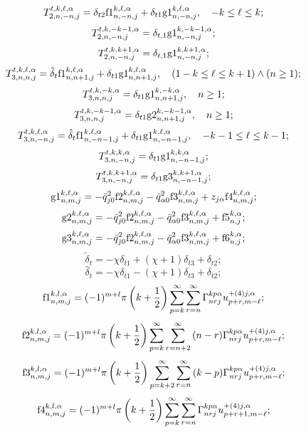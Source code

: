 \begin{theorem}
\[T_{2,n, - n,j}^{t,k,\ell ,\alpha } = {\delta _{t2}}{\rm{f1}}_{n, - n,j}^{k,\ell ,\alpha } + {\delta _{t1}}{\rm g1}_{n, - n,j}^{k,\ell ,\alpha },\quad - k \le \ell  \le k;\]
\[T_{2,n, - n,j}^{t,k,-k-1,\alpha } =  {\delta _{t,1}}{\rm g1}_{n, - n,j}^{k,-k-1,\alpha };\]
\[T_{2,n, - n,j}^{t,k,k + 1,\alpha } =  {\delta _{t,1}}{\rm g1}_{n, - n,j}^{k,k + 1,\alpha };\]
\[T_{3,n,n,j}^{t,k,\ell ,\alpha } = {\tilde \delta _t}{\rm{f1}}_{n,n + 1,j}^{k,\ell ,\alpha } + {\delta _{t1}}{\rm g1}_{n,n + 1,j}^{k,\ell ,\alpha },\quad (1 - k \le \ell  \le k + 1) \wedge (n \ge 1);\]
\[T_{3,n,n,j}^{t,k, - k,\alpha } = {\delta _{t1}}{\rm g1}_{n,n + 1,j}^{k, - k,\alpha },\quad n\ge 1;\]
\[T_{3,n,n,j}^{t,k, - k - 1,\alpha } = {\delta _{t1}}{\rm g2}_{n,n + 1,j}^{k, - k - 1,\alpha },\quad n\ge 1;\]
\[T_{3,n, - n,j}^{t,k,\ell ,\alpha } = {\hat \delta _t}{\rm{f1}}_{n, - n - 1,j}^{k,\ell ,\alpha } + {\delta _{t1}}{\rm g1}_{n, - n - 1,j}^{k,\ell ,\alpha },\quad - k - 1 \le \ell  \le k - 1;\]
\[T_{3,n, - n,j}^{t,k,k,\alpha } = {\delta _{t1}}{\rm g1}_{n, - n - 1,j}^{k,k,\alpha };\]
\[T_{3,n, - n,j}^{t,k,k + 1,\alpha } = {\delta _{t1}}{\rm g3}_{n, - n - 1,j}^{k,k + 1,\alpha };\]
\[{\rm g1}_{n,m,j}^{k,\ell ,\alpha } = -{{\bar q}}_{j0}^2{\rm{f2}}_{n,m,j}^{k,\ell ,\alpha } - {{\bar q}}_{\alpha 0}^2{\rm{f3}}_{n,m,j}^{k,\ell ,\alpha } + {{{z}}_{{{j}}\alpha }}{\rm{f4}}_{n,m,j}^{k,\ell ,\alpha };\]
\[{\rm g2}_{n,m,j}^{k,\ell ,\alpha } = -{{\bar q}}_{j0}^2{\rm{f2}}_{n,m,j}^{k,\ell ,\alpha } - {{\bar q}}_{\alpha 0}^2{\rm{f3}}_{n,m,j}^{k,\ell ,\alpha } + {\rm{f5}}_{n,j}^{k,\alpha };\]
\[{\rm g3}_{n,m,j}^{k,\ell ,\alpha } = -{{\bar q}}_{j0}^2{\rm{f2}}_{n,m,j}^{k,\ell ,\alpha } - {{\bar q}}_{\alpha 0}^2{\rm{f3}}_{n,m,j}^{k,\ell ,\alpha } + {\rm{f6}}_{n,j}^{k,\alpha };\]
\[{\tilde \delta _t} =  - \chi {\delta _{t1}} + (\chi  + 1){\delta _{t3}} + {\delta _{t2}};\]
\[{\hat \delta _t} =  - \chi {\delta _{t1}} - (\chi  + 1){\delta _{t3}} + {\delta _{t2}};\]
\[{\rm{f1}}_{n,m,j}^{k,l,\alpha } = (-1)^{m+l}\pi \left( {k + \frac{1}{2}} \right)\sum\limits_{p = k}^\infty  {\sum\limits_{r = n}^\infty  {\Gamma _{nrj}^{kp\alpha }{u}_{p + r,m - \ell }^{ + (4)j,\alpha }} };\]
\[{\rm{f2}}_{n,m,j}^{k,l,\alpha } = (-1)^{m+l}\pi \left( {k + \frac{1}{2}} \right)\sum\limits_{p = k}^\infty  {\sum\limits_{r = n + 2}^\infty  {(n - r)\Gamma _{nrj}^{kp\alpha }{u}_{p + r,m - \ell }^{ + (4)j,\alpha }} };\]
\[{\rm{f3}}_{n,m,j}^{k,l,\alpha } = (-1)^{m+l}\pi \left( {k + \frac{1}{2}} \right)\sum\limits_{p = k + 2}^\infty  {\sum\limits_{r = n}^\infty  {(k - p)\Gamma _{nrj}^{kp\alpha }{u}_{p + r,m - \ell }^{ + (4)j,\alpha }} };\]
\[{\rm{f4}}_{n,m,j}^{k,l,\alpha } = (-1)^{m+l}\pi \left( {k + \frac{1}{2}} \right)\sum\limits_{p = k}^\infty  {\sum\limits_{r = n}^\infty  {\Gamma _{nrj}^{kp\alpha }{u}_{p + r + 1,m - \ell }^{ + (4)j,\alpha }} };\]

\end{theorem}
